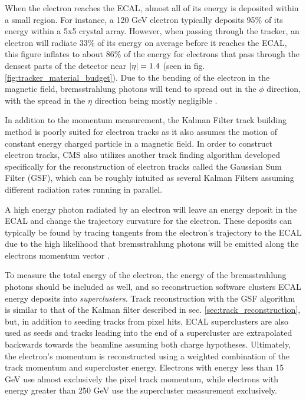     When the electron reaches the ECAL, almost all of its energy is deposited within a small region. For instance, a 120 GeV electron typically deposits 95\% of its energy within a 5x5 crystal array. However, when passing through the tracker, an electron will radiate 33\% of its energy on average before it reaches the ECAL, this figure inflates to about 86\% of the energy for electrons that pass through the densest parts of the detector near $\lvert \eta \rvert = 1.4$ (seen in fig. \ref{fig:tracker_material_budget}). Due to the bending of the electron in the magnetic field, bremsstrahlung photons will tend to spread out in the $\phi$ direction, with the spread in the $\eta$ direction being mostly negligible \cite[sec. 4.1]{Electron_reco}.

    In addition to the momentum measurement, the Kalman Filter track building method is poorly suited for electron tracks as it also assumes the motion of constant energy charged particle in a magnetic field. In order to construct electron tracks, CMS also utilizes another track finding algorithm developed specifically for the reconstruction of electron tracks called the Gaussian Sum Filter (GSF)\cite{cms_gsf}, which can be roughly intuited as several Kalman Filters assuming different radiation rates running in parallel. 

    A high energy photon radiated by an electron will leave an energy deposit in the ECAL and change the trajectory curvature for the electron. These deposits can typically be found by tracing tangents from the electron's trajectory to the ECAL due to the high likelihood that bremsstrahlung photons will be emitted along the electrons momentum vector . 

    To measure the total energy of the electron, the energy of the bremsstrahlung photons should be included as well, and so reconstruction software clusters ECAL energy deposits into \emph{superclusters}. Track reconstruction with the GSF algorithm is similar to that of the Kalman filter described in sec. \ref{sec:track_reconstruction}, but, in addition to seeding tracks from pixel hits, ECAL superclusters are also used as seeds and tracks leading into the end of a supercluster are extrapolated backwards towards the beamline assuming both charge hypotheses.  Ultimately, the electron's momentum is reconstructed using a weighted combination of the track momentum and supercluster energy. Electrons with energy less than 15 GeV use almost exclusively the pixel track momentum, while electrons with energy greater than 250 GeV use the supercluster measurement exclusively. 

